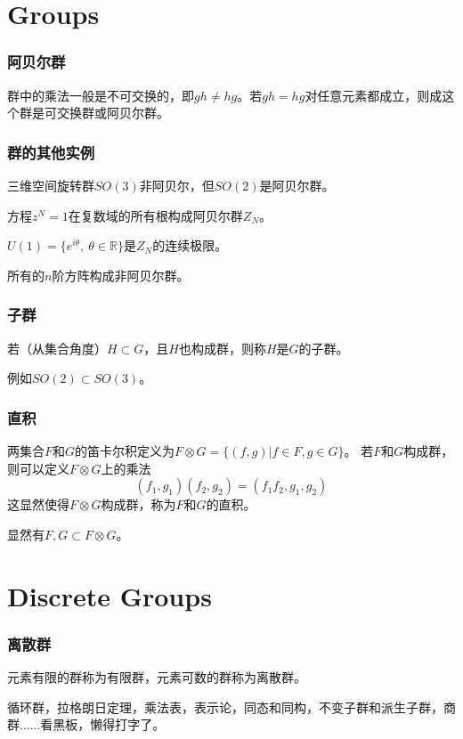 \documentclass[CJK]{beamer}
\newcommand{\reals}{\mathbb{R}}
\begin{document}
\section{Groups}
\begin{frame}
\frametitle{\bch 阿贝尔群 \ech}
\bch
群中的乘法一般是不可交换的，即$gh \not= hg$。若$gh = hg$对任意元素都成立，则成这个群是可交换群或阿贝尔群。

\ech
\end{frame}

\begin{frame}
\frametitle{\bch 群的其他实例 \ech}
\bch
三维空间旋转群$SO(3)$非阿贝尔，但$SO(2)$是阿贝尔群。
\par
方程$z^N = 1$在复数域的所有根构成阿贝尔群$Z_N$。
\par
$U(1) = \{ e^{i \theta},\ \theta \in \reals\}$是$Z_N$的连续极限。
\par
所有的$n$阶方阵构成非阿贝尔群。

\ech
\end{frame}

\begin{frame}
\frametitle{\bch 子群 \ech}
\bch
若（从集合角度）$H\subset G$，且$H$也构成群，则称$H$是$G$的子群。\par
例如$SO(2) \subset SO(3)$。


\ech
\end{frame}

\begin{frame}
\frametitle{\bch 直积 \ech}
\bch
两集合$F$和$G$的笛卡尔积定义为$F\otimes G = \{ (f,g) | f\in F, g \in G\}$。
若$F$和$G$构成群，则可以定义$F\otimes G$上的乘法
$$ (f_1,g_1) (f_2,g_2) = (f_1 f_2,g_1,g_2)$$
这显然使得$F\otimes G$构成群，称为$F$和$G$的直积。
\par
显然有$F,G \subset F \otimes G$。


\ech
\end{frame}



\section{Discrete Groups}
\begin{frame}
\frametitle{\bch 离散群 \ech}
\bch
元素有限的群称为有限群，元素可数的群称为离散群。\par
循环群，拉格朗日定理，乘法表，表示论，同态和同构，不变子群和派生子群，商群......看黑板，懒得打字了。


\ech
\end{frame}
\end{document}
